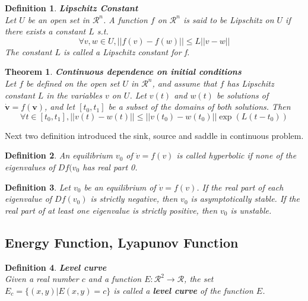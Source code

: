 \documentclass[12pt]{article}
\theoremstyle{plain}
\newtheorem{theorem}{\textbf{Theorem}}[section]
\newtheorem{definition}{{\color{red}\textbf{Definition}}}[section]
\begin{document}
\begin{definition}\textbf{Lipschitz Constant}
\\\noindent Let $U$ be an open set in $\mathcal R^n$. A function $f$ on $\mathcal R^n$ is said to be Lipschitz on $U$ if there exists a constant $L$ s.t.
$$
\forall v, w \in U, ||f(v) - f(w)|| \leq L||v - w||
$$
The constant $L$ is called a Lipschitz constant for f.
\end{definition}




\begin{theorem}\textbf{Continuous dependence on initial conditions}
\\\noindent Let $f$ be defined on the open set $U$ in $\mathcal R^n$, and assume that $f$ has Lipschitz constant $L$ in the variables $v$ on $U$. Let $v(t)$ and $w(t)$ be solutions of $\dot {\mathbf v} = f(\mathbf v)$, and let $[t_0,t_1]$ be a subset of the domains of both solutions. Then
$$
\forall t \in [t_0, t_1], ||v(t) - w(t)|| \leq ||v(t_0) - w(t_0)||\exp(L(t - t_0))
$$

\end{theorem}



Next two definition introduced the sink, source and saddle in continuous problem.
\begin{definition}An equilibrium $v_0$ of $\dot v = f(v)$ is called hyperbolic if none of the eigenvalues of $Df(v_0$ has real part 0.
\end{definition}


\begin{definition}
Let $v_0$ be an equilibrium of $\dot v = f(v)$. If the real part of each eigenvalue of $Df(v_0)$ is strictly negative, then $v_0$ is asymptotically stable. If the real part of at least one eigenvalue is strictly positive, then $v_0$ is unstable.
\end{definition}





\subsection{Energy Function, Lyapunov Function}

\begin{definition}\textbf{Level curve}
\\\noindent Given a real number $c$ and a function $E : \mathcal R^2 \rightarrow \mathcal R$, the
set $E_c = \{(x, y)| E(x, y) = c\}$ is called a \textbf{level curve} of the function $E$.
\end{definition}
\end{document}
